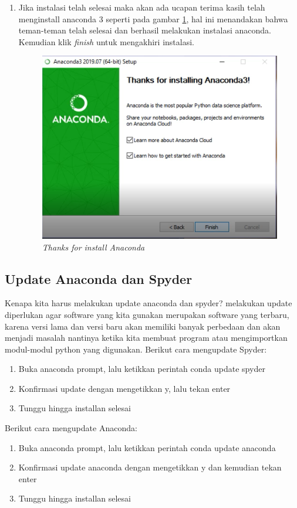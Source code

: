 \begin{enumerate}
\item Jika instalasi telah selesai maka akan ada ucapan terima kasih telah menginstall anaconda 3 seperti pada gambar \ref{Figureanaconda9}, hal ini menandakan bahwa teman-teman telah selesai dan berhasil melakukan instalasi anaconda. Kemudian klik \textit{finish} untuk mengakhiri instalasi.

\begin{figure}[H]
    \centering
    \includegraphics[scale=0.75]{figures/11}
    \caption{\textit{Thanks for install Anaconda}}
    \label{Figureanaconda9}
\end{figure}
\end{enumerate}

\subsection{Update Anaconda dan Spyder}
Kenapa kita harus melakukan update anaconda dan spyder? melakukan update diperlukan agar software yang kita gunakan merupakan software yang terbaru, karena versi lama dan versi baru akan memiliki banyak perbedaan dan akan menjadi masalah nantinya ketika kita membuat program atau mengimportkan modul-modul python yang digunakan.
Berikut cara mengupdate Spyder:
\begin{enumerate}
\item Buka anaconda prompt, lalu ketikkan perintah conda update spyder
\item Konfirmasi update dengan mengetikkan y, lalu tekan enter
\item Tunggu hingga installan selesai
\end{enumerate}
Berikut cara mengupdate Anaconda:
\begin{enumerate}
\item Buka anaconda prompt, lalu ketikkan perintah conda update anaconda
\item Konfirmasi update anaconda dengan mengetikkan y dan kemudian tekan enter
\item Tunggu hingga installan selesai
\end{enumerate}


